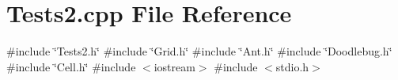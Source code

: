 \section{Tests2.\+cpp File Reference}
\label{Tests2_8cpp}
{\ttfamily \#include \char`\"{}Tests2.\+h\char`\"{}}\newline
{\ttfamily \#include \char`\"{}Grid.\+h\char`\"{}}\newline
{\ttfamily \#include \char`\"{}Ant.\+h\char`\"{}}\newline
{\ttfamily \#include \char`\"{}Doodlebug.\+h\char`\"{}}\newline
{\ttfamily \#include \char`\"{}Cell.\+h\char`\"{}}\newline
{\ttfamily \#include $<$iostream$>$}\newline
{\ttfamily \#include $<$stdio.\+h$>$}\newline
